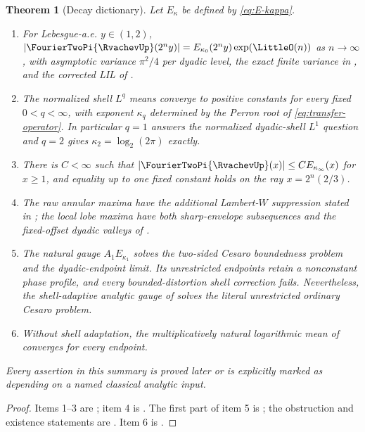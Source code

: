 \documentclass[11pt,oneside]{article}
\numberwithin{equation}{section}
\newtheorem{theorem}{Theorem}[section]
\theoremstyle{definition}
\theoremstyle{remark}
\begin{document}
\begin{theorem}[Decay dictionary]
\label{thm:decay-dictionary}
Let $E_\kappa$ be defined by \eqref{eq:E-kappa}.
\begin{enumerate}
\item For Lebesgue-a.e. $y\in(1,2)$,
$|\FourierTwoPi{\RvachevUp}(2^ny)|=E_{\kappa_0}(2^ny)\exp(\LittleO(n))$ as $n\to\infty$, with asymptotic
variance $\pi^2/4$ per dyadic level, the exact finite variance in
, and the corrected LIL of .
\item The normalized shell $L^q$ means converge to positive constants for every fixed
$0<q<\infty$, with exponent $\kappa_q$ determined by the Perron root of
\eqref{eq:transfer-operator}.  In particular $q=1$ answers the normalized dyadic-shell
$L^1$ question and $q=2$ gives $\kappa_2=\log_2(2\pi)$ exactly.
\item There is $C<\infty$ such that $|\FourierTwoPi{\RvachevUp}(x)|\le C E_{\kappa_\infty}(x)$ for $x\ge1$,
and equality up to one fixed constant holds on the ray $x=2^n(2/3)$.
\item The raw annular maxima have the additional Lambert-$W$ suppression stated in
; the local lobe maxima have both sharp-envelope subsequences and the
fixed-offset dyadic valleys of .
\item The natural gauge $A_1E_{\kappa_1}$ solves the two-sided Cesaro boundedness problem
and the dyadic-endpoint limit.  Its unrestricted endpoints retain a nonconstant phase
profile, and every bounded-distortion shell correction fails.  Nevertheless, the
shell-adaptive analytic gauge of  solves the literal
unrestricted ordinary Cesaro problem.
\item Without shell adaptation, the multiplicatively natural logarithmic mean of
 converges for every endpoint.
\end{enumerate}
Every assertion in this summary is proved later or is explicitly marked as depending on a
named classical analytic input.
\end{theorem}
\begin{proof}
Items 1--3 are ; item 4 is
.  The first part of item 5 is
; the obstruction and existence statements are
.  Item 6 is
.
\end{proof}
\end{document}
